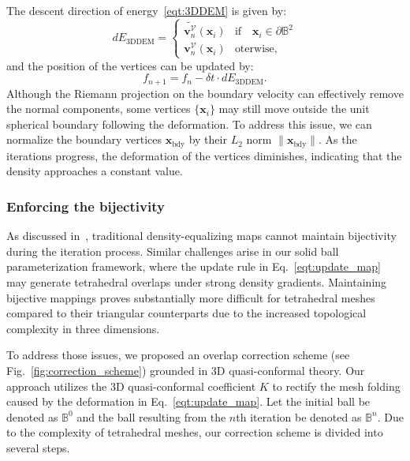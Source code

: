 \documentclass{article}
\begin{document}
The descent direction of energy~\eqref{eqt:3DDEM} is given by:
\begin{equation}
    dE_{\text{3DDEM}} = 
      \left \{
    \begin{array}{ll}
        \widetilde{\mathbf{v}^{\mathcal{V}}_n}(\mathbf{x}_i)  & \text{if}\quad \mathbf{x}_i \in \partial \mathbb B^2 \\
    \mathbf{v}^{\mathcal{V}}_n(\mathbf{x}_i)     & \text{oterwise}, 
    \end{array}    
    \right.
\end{equation}
and the position of the vertices can be updated by:
\begin{equation}\label{eqt:update_map}
    f_{n+1} = f_n - \delta t \cdot dE_{\text{3DDEM}}.
\end{equation}
Although the Riemann projection on the boundary velocity can effectively remove the normal components, some vertices $\{\mathbf{x}_i\}$ may still move outside the unit spherical boundary following the deformation. To address this issue, we can normalize the boundary vertices $\mathbf{x}_{\text{bdy}}$ by their $L_2$ norm $\|\mathbf{x}_{\text{bdy}}\|$. As the iterations progress, the deformation of the vertices diminishes, indicating that the density approaches a constant value.

\subsubsection{Enforcing the bijectivity}\label{ssec:enfore_bijective}
As discussed in~\cite{lyu2024bijective,lyu2024spherical}, traditional density-equalizing maps cannot maintain bijectivity during the iteration process. Similar challenges arise in our solid ball parameterization framework, where the update rule in Eq.~\eqref{eqt:update_map} may generate tetrahedral overlaps under strong density gradients. Maintaining bijective mappings proves substantially more difficult for tetrahedral meshes compared to their triangular counterparts due to the increased topological complexity in three dimensions.

To address those issues, we proposed an overlap correction scheme (see Fig.~\ref{fig:correction_scheme}) grounded in 3D quasi-conformal theory. Our approach utilizes the 3D quasi-conformal coefficient $K$ to rectify the mesh folding caused by the deformation in Eq.~\eqref{eqt:update_map}. Let the initial ball be denoted as $\mathbb B^0$ and the ball resulting from the $n$th iteration be denoted as $\mathbb B^n$. Due to the complexity of tetrahedral meshes, our correction scheme is divided into several steps.
\end{document}
